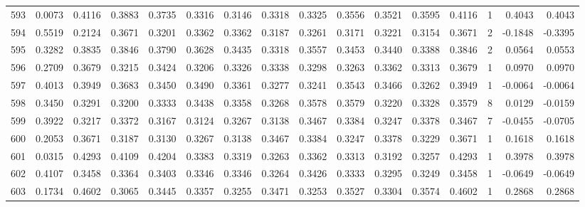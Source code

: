 \begin{tabular}{lrrrrrrrrrrrrrrr}
593 &      0.0073 &  0.4116 &  0.3883 &  0.3735 &  0.3316 &  0.3146 &  0.3318 &  0.3325 &  0.3556 &  0.3521 &   0.3595 &     0.4116 &      1 &                    0.4043 &                     0.4043 \\
594 &      0.5519 &  0.2124 &  0.3671 &  0.3201 &  0.3362 &  0.3362 &  0.3187 &  0.3261 &  0.3171 &  0.3221 &   0.3154 &     0.3671 &      2 &                   -0.1848 &                    -0.3395 \\
595 &      0.3282 &  0.3835 &  0.3846 &  0.3790 &  0.3628 &  0.3435 &  0.3318 &  0.3557 &  0.3453 &  0.3440 &   0.3388 &     0.3846 &      2 &                    0.0564 &                     0.0553 \\
596 &      0.2709 &  0.3679 &  0.3215 &  0.3424 &  0.3206 &  0.3326 &  0.3338 &  0.3298 &  0.3263 &  0.3362 &   0.3313 &     0.3679 &      1 &                    0.0970 &                     0.0970 \\
597 &      0.4013 &  0.3949 &  0.3683 &  0.3450 &  0.3490 &  0.3361 &  0.3277 &  0.3241 &  0.3543 &  0.3466 &   0.3262 &     0.3949 &      1 &                   -0.0064 &                    -0.0064 \\
598 &      0.3450 &  0.3291 &  0.3200 &  0.3333 &  0.3438 &  0.3358 &  0.3268 &  0.3578 &  0.3579 &  0.3220 &   0.3328 &     0.3579 &      8 &                    0.0129 &                    -0.0159 \\
599 &      0.3922 &  0.3217 &  0.3372 &  0.3167 &  0.3124 &  0.3267 &  0.3138 &  0.3467 &  0.3384 &  0.3247 &   0.3378 &     0.3467 &      7 &                   -0.0455 &                    -0.0705 \\
600 &      0.2053 &  0.3671 &  0.3187 &  0.3130 &  0.3267 &  0.3138 &  0.3467 &  0.3384 &  0.3247 &  0.3378 &   0.3229 &     0.3671 &      1 &                    0.1618 &                     0.1618 \\
601 &      0.0315 &  0.4293 &  0.4109 &  0.4204 &  0.3383 &  0.3319 &  0.3263 &  0.3362 &  0.3313 &  0.3192 &   0.3257 &     0.4293 &      1 &                    0.3978 &                     0.3978 \\
602 &      0.4107 &  0.3458 &  0.3364 &  0.3403 &  0.3346 &  0.3346 &  0.3264 &  0.3426 &  0.3333 &  0.3295 &   0.3249 &     0.3458 &      1 &                   -0.0649 &                    -0.0649 \\
603 &      0.1734 &  0.4602 &  0.3065 &  0.3445 &  0.3357 &  0.3255 &  0.3471 &  0.3253 &  0.3527 &  0.3304 &   0.3574 &     0.4602 &      1 &                    0.2868 &                     0.2868 \\

\end{tabular}
